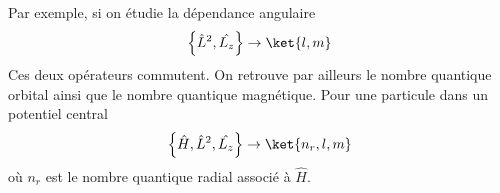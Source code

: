 Par exemple, si on étudie la dépendance angulaire
\begin{equation}
\left\{\hat{L}^2, \hat{L_z}\right\} \rightarrow \ket{l,m}
\end{equation}
Ces deux opérateurs commutent. On retrouve par ailleurs le nombre quantique 
orbital ainsi que le nombre quantique magnétique. Pour une particule dans un 
potentiel central 
\begin{equation}
\left\{\hat{H},\hat{L}^2, \hat{L_z}\right\} \rightarrow \ket{n_r,l,m}
\end{equation}
où $n_r$ est le nombre quantique radial associé à $\hat{H}$.